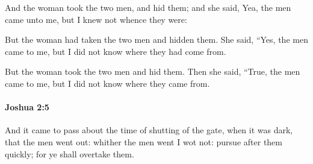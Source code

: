 			\begin{versebox}
					\item[BHS] 
					\item[ASV] And the woman took the two men, and hid them; and she said, Yea, the men came unto me, but I knew not whence they were:
					\item[NIV] But the woman had taken the two men and hidden them. She said, “Yes, the men came to me, but I did not know where they had come from.
					\item[NRSV] But the woman took the two men and hid them. Then she said, “True, the men came to me, but I did not know where they came from.
			\end{versebox}

		\paragraph{Joshua 2:5} %
			\label{JOSHUA-2-5}

			And it came to pass about the time of shutting of the gate, when it was dark, that the men went out: whither the men went I wot not: pursue after them quickly; for ye shall overtake them.

